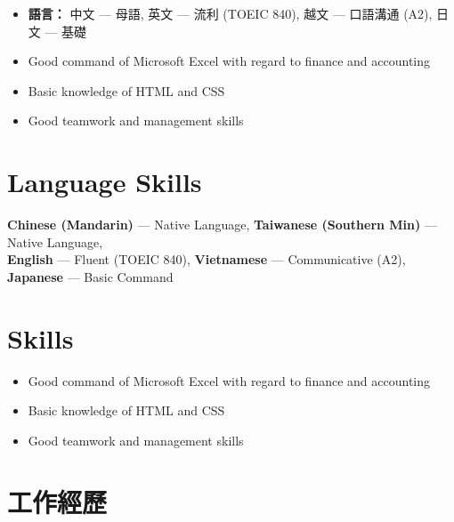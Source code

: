 \documentclass[a4paper,10pt]{article}
\begin{document}
\begin{itemize}
\item \textbf{語言：}
  {中文} --- 母語, 
  {英文} --- 流利 (TOEIC 840),
  {越文} --- 口語溝通 (A2),
  {日文} --- 基礎 

\item Good command of Microsoft Excel with regard to finance and accounting
\item Basic knowledge of HTML and CSS
\item Good teamwork and management skills

\end{itemize}

\section{Language Skills}

\textbf{Chinese (Mandarin)} --- Native Language,
\textbf{Taiwanese (Southern Min)} --- Native Language,\\
\textbf{English} --- Fluent (TOEIC 840),
\textbf{Vietnamese} --- Communicative (A2),
\textbf{Japanese} --- Basic Command

\section{Skills}

\begin{itemize}
\item Good command of Microsoft Excel with regard to finance and accounting
\item Basic knowledge of HTML and CSS
\item Good teamwork and management skills

\end{itemize}


\section{工作經歷}
\end{document}
